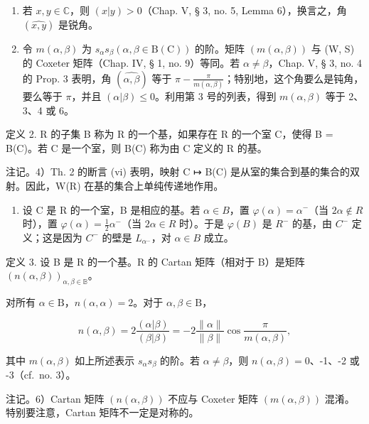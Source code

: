 \begin{enumerate}
\def\labelenumi{\arabic{enumi})}
\setcounter{enumi}{1}
\item
  若 \(x, y \in \mathbb{C}\)，则 \((x|y) > 0\)（Chap. V, § 3, no. 5, Lemma 6），换言之，角 \((\widehat{x,y})\) 是锐角。
\item
  令 \(m(\alpha, \beta)\) 为 \(s_{\alpha} s_{\beta} (\alpha, \beta \in \mathrm{B}(\mathrm{C}))\) 的阶。矩阵 \((m(\alpha, \beta))\) 与 (W, S) 的 Coxeter 矩阵（Chap. IV, § 1, no. 9）等同。若 \(\alpha \neq \beta\)，Chap. V, § 3, no. 4 的 Prop. 3 表明，角 \((\widehat{\alpha, \beta})\) 等于 \(\pi - \frac{\pi}{m(\alpha, \beta)}\)；特别地，这个角要么是钝角，要么等于 \(\pi\)，并且 \((\alpha | \beta) \leqslant 0\)。利用第 3 号的列表，得到 \(m(\alpha, \beta)\) 等于 2、3、4 或 6。
\end{enumerate}

定义 2. R 的子集 B 称为 R 的一个基，如果存在 R 的一个室 C，使得 B = B(C)。若 C 是一个室，则 B(C) 称为由 C 定义的 R 的基。

注记。4）Th. 2 的断言 (vi) 表明，映射 C ↦ B(C) 是从室的集合到基的集合的双射。因此，W(R) 在基的集合上单纯传递地作用。

\begin{enumerate}
\def\labelenumi{\arabic{enumi})}
\setcounter{enumi}{4}
\tightlist
\item
  设 C 是 R 的一个室，B 是相应的基。若 \(\alpha\in B\)，置 \(\varphi(\alpha)=\alpha^{-}\)（当 \(2\alpha\notin R\) 时），置 \(\varphi(\alpha)=\frac{1}{2}\alpha^{-}\)（当 \(2\alpha\in R\) 时）。于是 \(\varphi(B)\) 是 \(R^{-}\) 的基，由 \(C^{-}\) 定义；这是因为 \(C^{-}\) 的壁是 \(L_{\alpha^{-}}\)，对 \(\alpha\in B\) 成立。
\end{enumerate}

定义 3. 设 B 是 R 的一个基。R 的 Cartan 矩阵（相对于 B）是矩阵 \((n(\alpha,\beta))_{\alpha,\beta\in\mathbb{B}}\)。

对所有 \(\alpha \in \mathrm{B}\)，\(n(\alpha, \alpha) = 2\)。对于 \(\alpha, \beta \in \mathrm{B}\)，

\[
n (\alpha , \beta) = 2 \frac {(\alpha | \beta)}{(\beta | \beta)} = - 2 \frac {\| \alpha \|}{\| \beta \|} \cos \frac {\pi}{m (\alpha , \beta)},\tag{11}
\]

其中 \(m(\alpha, \beta)\) 如上所述表示 \(s_{\alpha}s_{\beta}\) 的阶。若 \(\alpha \neq \beta\)，则 \(n(\alpha, \beta) = 0\)、-1、-2 或 -3（cf.~no. 3）。

注记。6）Cartan 矩阵 \((n(\alpha,\beta))\) 不应与 Coxeter 矩阵 \((m(\alpha,\beta))\) 混淆。特别要注意，Cartan 矩阵不一定是对称的。

